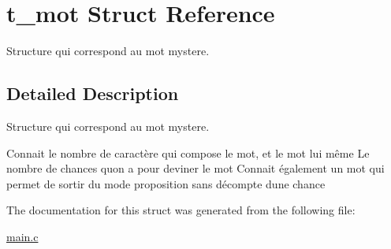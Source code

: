 \hypertarget{structt__mot}{}\section{t\+\_\+mot Struct Reference}
\label{structt__mot}


Structure qui correspond au mot mystere.  




\subsection{Detailed Description}
Structure qui correspond au mot mystere. 

Connait le nombre de caractère qui compose le mot, et le mot lui même Le nombre de chances qu\textquotesingle{}on a pour deviner le mot Connait également un mot qui permet de sortir du mode proposition sans décompte d\textquotesingle{}une chance 

The documentation for this struct was generated from the following file\+:\begin{DoxyCompactItemize}
\item 
\hyperlink{main_8c}{main.\+c}\end{DoxyCompactItemize}
